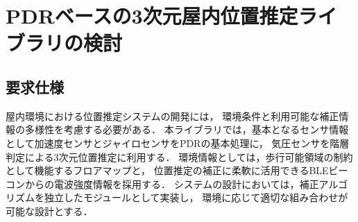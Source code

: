 \documentclass[a4paper, 10pt, twocolumn]{jarticle}
\begin{document}
\section{PDRベースの3次元屋内位置推定ライブラリの検討}


\subsection{要求仕様}



屋内環境における位置推定システムの開発には，
環境条件と利用可能な補正情報の多様性を考慮する必要がある．
本ライブラリでは，基本となるセンサ情報として加速度センサとジャイロセンサをPDRの基本処理に，
気圧センサを階層判定による3次元位置推定に利用する．
環境情報としては，歩行可能領域の制約として機能するフロアマップと，
位置推定の補正に柔軟に活用できるBLEビーコンからの電波強度情報を採用する．
システムの設計においては，補正アルゴリズムを独立したモジュールとして実装し，
環境に応じて適切な組み合わせが可能な設計とする．
\end{document}

